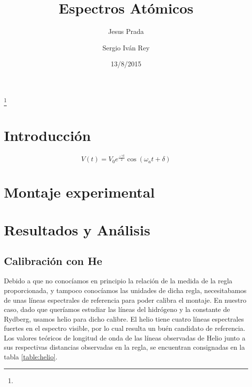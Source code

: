 \documentclass[%
 reprint,
 amsmath,amssymb,
 aps,
]{revtex4-1}
\begin{document}

\title{Espectros Atómicos}%
\thanks{}%

\author{Jesus Prada}
\author{Sergio Iv\'an Rey}%
%

\date{13/8/2015}%

\begin{abstract}

\end{abstract}


\keywords{}%
\maketitle


\section{\label{sec:level1}Introducci\'on}

\begin{equation}
V(t) = V_0 e^{\frac{-\gamma t}{2}}\cos(\omega_a t + \delta)
\label{eq:amortiguado}
\end{equation}

\section{\label{sec:level1}Montaje experimental}

\section{\label{sec:level1}Resultados y An\'alisis}
\subsection{\label{sec:level2}Calibración con He}
Debido a que no conocíamos en principio la relación de la medida de la regla proporcionada, y tampoco conocíamos las unidades de dicha regla, necesitabamos de unas líneas espectrales de referencia para poder calibra el montaje. En nuestro caso, dado que queríamos estudiar las líneas del hidrógeno y la constante de Rydberg, usamos helio para dicho calibre. El helio tiene cuatro líneas espectrales fuertes en el espectro visible, por lo cual resulta un buén candidato de referencia. Los valores teóricos de longitud de onda de las líneas observadas de Helio junto a sus respectivas distancias observadas en la regla, se encuentran consignadas en la tabla \ref{table:helio}.
\end{document}
